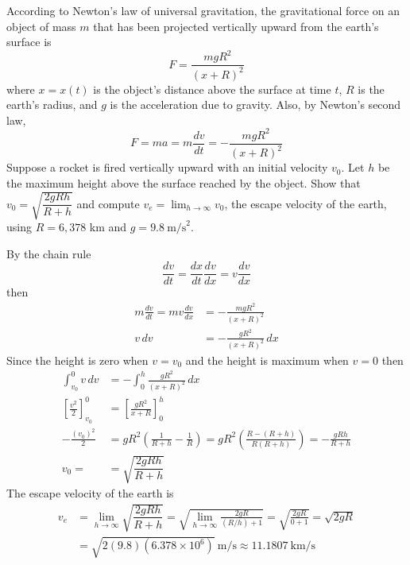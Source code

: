 \begin{problem}
    According to Newton's law of universal gravitation,
    the gravitational force on an object of mass \(m\) that has been
    projected vertically upward from the earth's surface is
    \[F=\frac{mgR^2}{(x+R)^2}\]
    where \(x=x(t)\) is the object's distance
    above the surface at time \(t\), \(R\) is the
    earth's radius, and \(g\) is the acceleration due to gravity.
    Also, by Newton's second law,
    \[F=ma=m\frac{dv}{dt}=-\frac{mgR^2}{(x+R)^2}\]
    Suppose a rocket is fired vertically upward with an initial velocity \(v_0\).
    Let \(h\) be the maximum height above the surface reached by the object.
    Show that \(v_0=\sqrt{\dfrac{2gRh}{R+h}}\) and compute
    \(v_e=\lim_{h\to\infty}v_0\), the escape velocity of the earth, using
    \(R=6,378\) km and \(g=9.8\ \text{m/s}^2\).
\end{problem}
\begin{solution}
    By the chain rule
    \[\frac{dv}{dt}=\frac{dx}{dt}\frac{dv}{dx}=v\frac{dv}{dx}\]
    then
    \begin{align*}
        m\frac{dv}{dt}=mv\frac{dv}{dx} &= -\frac{mgR^2}{(x+R)^2} \\
        v\,dv &= -\frac{gR^2}{(x+R)^2}\,dx
    \end{align*}
    Since the height is zero when \(v=v_0\) and the height is maximum when
    \(v=0\) then
    \begin{align*}
        \int_{v_0}^0 v\,dv &= -\int_0^h \frac{gR^2}{(x+R)^2}\,dx \\
        \left[\frac{v^2}{2}\right]_{v_0}^0
        &= \left[\frac{gR^2}{x+R}\right]_0^h \\
        -\frac{(v_0)^2}{2} &= gR^2\left(\frac{1}{R+h}-\frac{1}{R}\right)
        =gR^2\left(\frac{R-(R+h)}{R(R+h)}\right)=-\frac{gRh}{R+h} \\
        v_0= &= \sqrt{\dfrac{2gRh}{R+h}}
    \end{align*}
    The escape velocity of the earth is
    \begin{align*}
        v_e &= \lim_{h\to\infty}\sqrt{\dfrac{2gRh}{R+h}}
        =\sqrt{\lim_{h\to\infty}\frac{2gR}{(R/h)+1}}=\sqrt{\frac{2gR}{0+1}}
        =\sqrt{2gR} \\
        &=\sqrt{2(9.8)(6.378\times10^6)}\ \text{m/s}
        \approx 11.1807\ \text{km/s}
    \end{align*}
\end{solution}